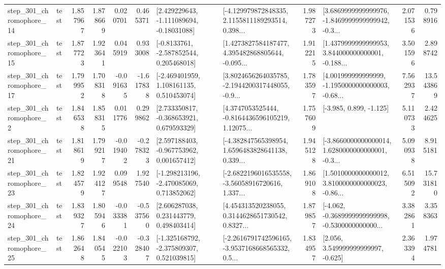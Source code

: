 \begin{tabular}{llrrrrllrlrr}
  step\_301\_chromophore\_14 &      test &      1.857967 &    1.878669 &      0.020701 &  0.465371 &    [2.429229643, -1.111089694, -0.18031088] &  [-4.129979872848335, 2.1155811189293514, 0.398... &       1.987273 &  [3.6869999999999976, -1.8469999999999942, -0.3... &            2.071536 &          0.798916 \\
  step\_301\_chromophore\_15 &      test &      1.877723 &    1.923641 &      0.045919 &  0.933008 &     [-0.8133761, -2.587852544, 0.205468018] &  [1.4273827584187477, 4.395482868805644, -0.095... &       1.912215 &  [1.4379999999999953, 3.844000000000001, -0.188... &            3.501596 &          2.898742 \\
  step\_301\_chromophore\_17 &      test &      1.799952 &    1.708318 &     -0.091635 & -1.617838 &    [-2.469401959, 1.108161135, 0.510453074] &  [3.8024656264035785, -2.1944200317448055, -0.9... &       1.783597 &  [4.001999999999999, -1.1950000000000003, -0.68... &            7.562937 &         13.543869 \\
   step\_301\_chromophore\_2 &      test &      1.846538 &    1.858315 &      0.011776 &  0.299862 &    [2.733350817, -0.368653921, 0.679593329] &  [4.3747053525444, -0.8164436596105219, 1.12075... &       1.757609 &                            [-3.985, 0.899, -1.125] &            5.110733 &          2.424625 \\
  step\_301\_chromophore\_21 &      test &      1.818619 &    1.799217 &     -0.019402 & -0.278323 &    [2.597188403, -0.967753962, 0.001657412] &  [-4.382847565398954, 1.6596483828641138, 0.339... &       1.945128 &  [-3.8660000000000014, 1.6280000000000001, -0.3... &            5.090938 &          8.915181 \\
  step\_301\_chromophore\_23 &      test &      1.824579 &    1.924127 &      0.099548 &  1.927540 &   [-1.298213196, -2.470085069, 0.713852062] &  [-2.6822196016535558, -3.56058916720616, 1.337... &       1.869108 &  [1.5010000000000012, 3.8100000000000023, -0.86... &            6.515092 &         15.731810 \\
  step\_301\_chromophore\_24 &      test &      1.839327 &    1.805946 &     -0.033381 & -0.537560 &     [2.606287038, 0.231443779, 0.498403414] &  [4.454313520238055, 0.3144628651730542, 0.8327... &       1.879857 &  [-4.062, -0.3689999999999998, -0.5300000000000... &            3.382861 &          3.358363 \\
  step\_301\_chromophore\_25 &      test &      1.862648 &    1.840545 &     -0.022103 & -0.328407 &   [-1.325168792, -2.375809307, 0.521039815] &  [-2.2616791742596165, -3.9537168668565332, 0.5... &       1.834957 &                 [2.056, 3.549999999999997, -0.625] &            2.363394 &          1.974781 \\

\end{tabular}
